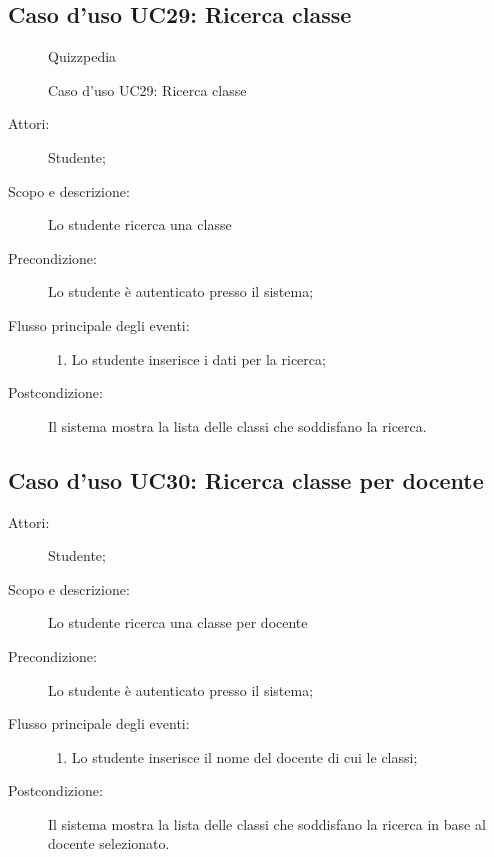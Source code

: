 \subsection{Caso d'uso UC29: Ricerca classe}
        \begin{figure}[H]
            \centering
            \begin{resizedtikzpicture}{\textwidth}
		\begin{umlsystem}[x=0, fill=lightgray!20]{Quizzpedia}
		\end{umlsystem}
            \end{resizedtikzpicture}
            \caption{Caso d'uso UC29: Ricerca classe}
            \label{fig:UC29} 
        \end{figure}
    \begin{description}
\item[Attori:] Studente;
\item[Scopo e descrizione:] Lo studente ricerca una classe
      \item[Precondizione:] Lo studente è autenticato presso il sistema;

        \item[Flusso principale degli eventi:] \begin{enumerate}
          \item Lo studente inserisce i dati per la ricerca;

      \end{enumerate}
    \item[Postcondizione:] Il sistema mostra la lista delle classi che soddisfano la ricerca.
  \end{description}
\hypertarget{UC30}{}
\subsection{Caso d'uso UC30: Ricerca classe per docente}\begin{description}
\item[Attori:] Studente;
\item[Scopo e descrizione:] Lo studente ricerca una classe per docente
      \item[Precondizione:] Lo studente è autenticato presso il sistema;

        \item[Flusso principale degli eventi:] \begin{enumerate}
          \item Lo studente inserisce il nome del docente di cui le classi;

      \end{enumerate}
    \item[Postcondizione:] Il sistema mostra la lista delle classi che soddisfano la ricerca in base al docente selezionato.
  \end{description}
\hypertarget{UC31}{}
